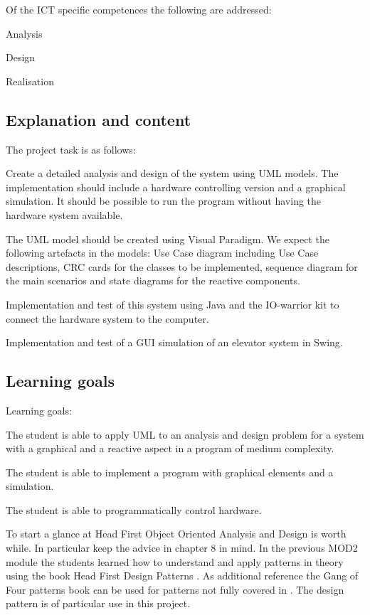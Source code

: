 Of the ICT specific competences the following are addressed:
\begin{Itemize}
\item Analysis
\item Design
\item Realisation
\end{Itemize}


\subsection{Explanation and  content}
The project task is as follows:
\begin{Enumerate}
\item Create a detailed analysis and design of the system using
  UML models. The implementation should include a hardware controlling version
  and a graphical simulation. It should be possible to run the program
  without having the hardware system available.
\item The UML model should be created using Visual Paradigm. We
  expect the following artefacts in the models: Use Case diagram
  including Use Case descriptions, CRC cards for the classes to be
  implemented, sequence diagram for the main scenarios and state
  diagrams for the reactive components.
\item Implementation and test of this system using Java and the
  IO-warrior kit to connect the hardware system to the computer.
\item Implementation and test of a GUI simulation of an elevator
  system in Swing.
\end{Enumerate}


\subsection{Learning goals}
Learning goals:

The student is able to apply UML to an analysis and design problem for
a  system with a graphical and a reactive aspect in a program of
medium complexity.

The student is able to implement a program with graphical elements and
a simulation.

The student is able to programmatically control hardware. 

To start a glance at Head First Object Oriented Analysis and Design
\cite{mclaughlin:2006:ooad} is worth while. In particular keep the advice in chapter
8 in mind.
In the previous MOD2 module the students learned how to understand and
apply patterns in theory using the book Head First Design Patterns \cite{freeman:2004:designpatterns}.
As additional reference the Gang of Four patterns book \cite{gamma:1995:patterns} can
be used for patterns not fully covered in
\cite{freeman:2004:designpatterns}. The design pattern 
is of particular use in this project.

